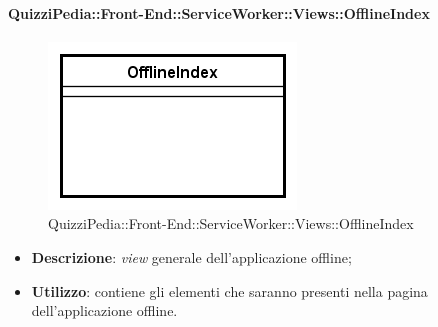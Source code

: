\paragraph[QuizziPedia::Front-End::ServiceWorker::Views::OfflineIndex]{QuizziPedia::Front-End::ServiceWorker::Views::OfflineIndex}
\begin{figure} [ht]
	\centering
	\includegraphics[scale=0.80]{UML/Classi/Front-End/QuizziPedia_Front-End_ServiceWorker_Views_OfflineIndex.png}
	\caption{QuizziPedia::Front-End::ServiceWorker::Views::OfflineIndex}
\end{figure} \FloatBarrier
\begin{itemize}
	\item \textbf{Descrizione}: \textit{view} generale dell'applicazione offline;
	\item \textbf{Utilizzo}: contiene gli elementi che saranno presenti nella pagina dell'applicazione offline.
\end{itemize}

